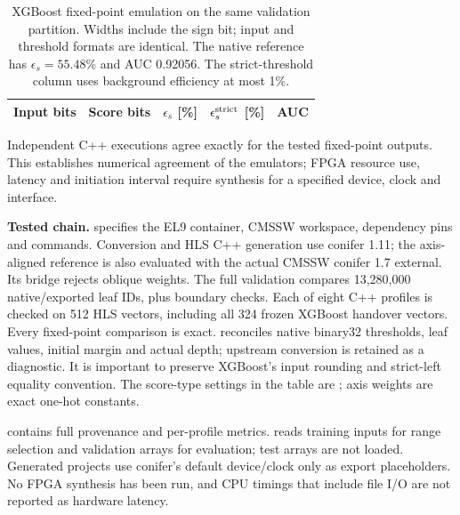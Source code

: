 \begin{table}[htbp]\centering\small
\caption{XGBoost fixed-point emulation on the same validation partition.
Widths include the sign bit; input and threshold formats are identical.
The native reference has $\epsilon_s=55.48\%$ and AUC 0.92056.
The strict-threshold column uses background efficiency at most 1\%.}
\label{tab:fixedpoint}\setlength{\tabcolsep}{5pt}
\begin{tabular}{@{}rrrrr@{}}\toprule
Input bits & Score bits & $\epsilon_s$ [\%] & $\epsilon_s^{\rm strict}$ [\%] & AUC\\\midrule
\end{tabular}
\end{table}
Independent C++ executions agree exactly for the tested fixed-point outputs.
This establishes numerical agreement of the emulators; FPGA resource use,
latency and initiation interval require synthesis for a specified device,
clock and interface.

\begin{implementation}
\textbf{Tested chain.}  specifies the
EL9 container, CMSSW workspace, dependency pins and commands. Conversion and
HLS C++ generation use conifer 1.11; the axis-aligned reference is also evaluated
with the actual CMSSW conifer 1.7 external. Its bridge rejects oblique weights.
The full validation compares 13,280,000 native/exported leaf IDs, plus boundary
checks. Each of eight C++ profiles is checked on 512 HLS vectors, including all
324 frozen XGBoost handover vectors. Every fixed-point comparison is exact.
 reconciles native binary32 thresholds, leaf
values, initial margin and actual depth; upstream conversion is retained
as a diagnostic. It is important to preserve XGBoost's input rounding and
strict-left equality convention. The score-type settings in the table are
; axis weights are exact one-hot constants.

 contains full provenance and
per-profile metrics.  reads training
inputs for range selection and validation arrays for evaluation; test arrays
are not loaded. Generated projects use conifer's default device/clock only as
export placeholders. No FPGA synthesis has been run, and CPU timings that
include file I/O are not reported as hardware latency.
\end{implementation}
